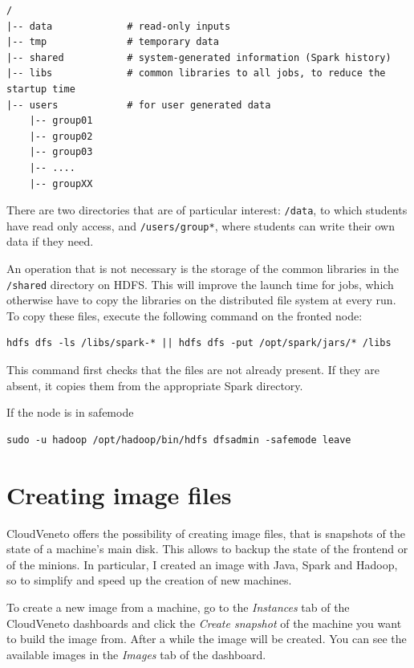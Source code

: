 \documentclass[justified]{tufte-handout}
\begin{document}
\begin{verbatim}
/
|-- data             # read-only inputs
|-- tmp              # temporary data
|-- shared           # system-generated information (Spark history)
|-- libs             # common libraries to all jobs, to reduce the startup time
|-- users            # for user generated data
    |-- group01
    |-- group02
    |-- group03
    |-- ....
    |-- groupXX
\end{verbatim}

There are two directories that are of particular interest:
\texttt{/data}, to which students have read only access, and
\texttt{/users/group*}, where students can write their own data if they
need.

An operation that is not necessary is the storage of the common
libraries in the \texttt{/shared} directory on HDFS. This will improve
the launch time for jobs, which otherwise have to copy the libraries on
the distributed file system at every run. To copy these files, execute
the following command on the fronted node:

\begin{verbatim}
hdfs dfs -ls /libs/spark-* || hdfs dfs -put /opt/spark/jars/* /libs
\end{verbatim}

This command first checks that the files are not already present. If
they are absent, it copies them from the appropriate Spark directory.

If the node is in safemode

\begin{verbatim}
sudo -u hadoop /opt/hadoop/bin/hdfs dfsadmin -safemode leave
\end{verbatim}

\appendix

\section{Creating image files}\label{creating-image-files}

\label{sec:creating-images}

CloudVeneto offers the possibility of creating image files, that is
snapshots of the state of a machine's main disk. This allows to backup
the state of the frontend or of the minions. In particular, I created an
image with Java, Spark and Hadoop, so to simplify and speed up the
creation of new machines.

To create a new image from a machine, go to the \emph{Instances} tab of
the CloudVeneto dashboards and click the \emph{Create snapshot} of the
machine you want to build the image from. After a while the image will
be created. You can see the available images in the \emph{Images} tab of
the dashboard.
\end{document}
